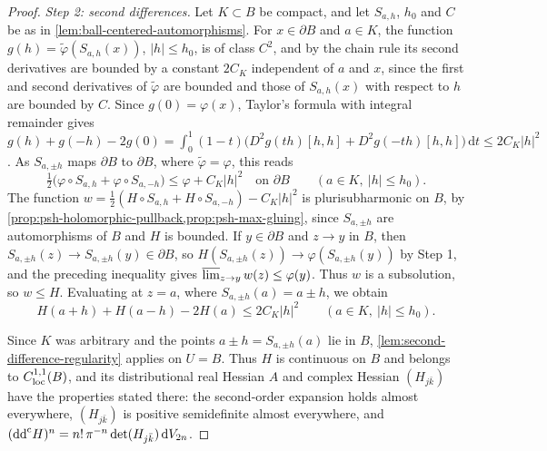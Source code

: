 \begin{proof}
\emph{Step 2: second differences.} Let $K\subset B$ be compact, and let $S_{a,h}$, $h_0$ and $C$ be as in \cref{lem:ball-centered-automorphisms}. For $x\in\partial B$ and $a\in K$, the function $g(h)=\tilde\varphi(S_{a,h}(x))$, $|h|\le h_0$, is of class $C^2$, and by the chain rule its second derivatives are bounded by a constant $2C_K$ independent of $a$ and $x$, since the first and second derivatives of $\tilde\varphi$ are bounded and those of $S_{a,h}(x)$ with respect to $h$ are bounded by $C$. Since $g(0)=\varphi(x)$, Taylor's formula with integral remainder gives $g(h)+g(-h)-2g(0)=\int_0^1(1-t)\bigl(D^2g(th)[h,h]+D^2g(-th)[h,h]\bigr)\,\mathrm dt\le2C_K|h|^2$. As $S_{a,\pm h}$ maps $\partial B$ to $\partial B$, where $\tilde\varphi=\varphi$, this reads
\[
 \tfrac12\bigl(\varphi\circ S_{a,h}+\varphi\circ S_{a,-h}\bigr)
                 \le\varphi+C_K|h|^2\quad\text{on }\partial B\qquad(a\in K,\ |h|\le h_0).
\]
The function $w=\frac12(H\circ S_{a,h}+H\circ S_{a,-h})-C_K|h|^2$ is plurisubharmonic on $B$, by \cref{prop:psh-holomorphic-pullback,prop:psh-max-gluing}, since $S_{a,\pm h}$ are automorphisms of $B$ and $H$ is bounded. If $y\in\partial B$ and $z\to y$ in $B$, then $S_{a,\pm h}(z)\to S_{a,\pm h}(y)\in\partial B$, so $H(S_{a,\pm h}(z))\to\varphi(S_{a,\pm h}(y))$ by Step 1, and the preceding inequality gives $\varlimsup_{z\to y}w(z)\le\varphi(y)$. Thus $w$ is a subsolution, so $w\le H$. Evaluating at $z=a$, where $S_{a,\pm h}(a)=a\pm h$, we obtain
\[
 H(a+h)+H(a-h)-2H(a)\le2C_K|h|^2\qquad(a\in K,\ |h|\le h_0).
\]

Since $K$ was arbitrary and the points $a\pm h=S_{a,\pm h}(a)$ lie in $B$, \cref{lem:second-difference-regularity} applies on $U=B$. Thus $H$ is continuous on $B$ and belongs to $C^{1,1}_{\mathrm{loc}}(B)$, and its distributional real Hessian $A$ and complex Hessian $(H_{j\bar k})$ have the properties stated there: the second-order expansion holds almost everywhere, $(H_{j\bar k})$ is positive semidefinite almost everywhere, and $(\mathrm{dd}^{\mathrm{c}} H)^n=n!\,\pi^{-n}\det(H_{j\bar k})\,\mathrm dV_{2n}$.


\end{proof}
